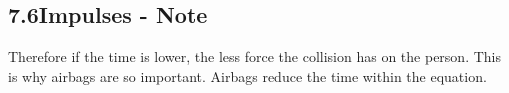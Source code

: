 \documentclass{article}
\begin{document}
\begin{adjustwidth}{1cm}{0pt}
    \subsection*{7.6\hspace*{0.5cm}Impulses - Note}
    Therefore if the time is lower, the less force the collision has on the person. This is why airbags are so important. Airbags reduce the time within the equation.

\end{adjustwidth}
\end{document}

